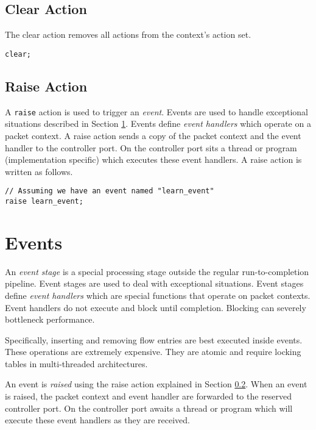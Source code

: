 \subsection{Clear Action} \label{tut:clear_action}

The clear action removes all actions from the context's action set.

\begin{lstlisting}
clear;
\end{lstlisting}

\subsection{Raise Action} \label{tut:raise_action}

A \texttt{raise} action is used to trigger an \textit{event}. Events are used to
handle exceptional situations described in Section \ref{tut:event}. Events
define \textit{event handlers} which operate on a packet context. A raise action
sends a copy of the packet context and the event handler to the controller port.
On the controller port sits a thread or program (implementation specific) which
executes these event handlers. A raise action is written as follows.

\begin{lstlisting}
// Assuming we have an event named "learn_event"
raise learn_event;
\end{lstlisting}

\section{Events} \label{tut:event}

An \textit{event stage} is a special processing stage outside the regular
run-to-completion pipeline. Event stages are used to deal with exceptional
situations. Event stages define \textit{event handlers} which are special
functions that operate on packet contexts. Event handlers do not execute and
block until completion. Blocking can severely bottleneck performance.

Specifically, inserting and removing flow entries are best executed inside
events. These operations are extremely expensive. They are atomic and require
locking tables in multi-threaded architectures.

An event is \textit{raised} using the raise action explained in Section
\ref{tut:raise_action}. When an event is raised, the packet context and event
handler are forwarded to the reserved controller port. On the controller port
awaits a thread or program which will execute these event handlers as they are
received.

